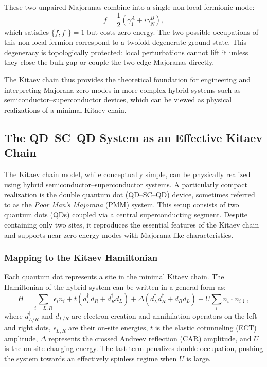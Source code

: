 \documentclass[11pt, letterpaper, titlepage]{article}
\begin{document}
These two unpaired Majoranas combine into a single non-local fermionic mode:
\begin{equation}
f = \frac{1}{2}(\gamma_1^A + i\gamma_N^B),
\end{equation}
which satisfies $\{f, f^\dagger\}=1$ but costs zero energy. The two possible occupations of this non-local fermion correspond to a twofold degenerate ground state. This degeneracy is topologically protected: local perturbations cannot lift it unless they close the bulk gap or couple the two edge Majoranas directly.

The Kitaev chain thus provides the theoretical foundation for engineering and interpreting Majorana zero modes in more complex hybrid systems such as semiconductor–superconductor devices, which can be viewed as physical realizations of a minimal Kitaev chain.
\subsection{The QD–SC–QD System as an Effective Kitaev Chain}

The Kitaev chain model, while conceptually simple, can be physically realized using hybrid semiconductor–superconductor systems. A particularly compact realization is the double quantum dot (QD–SC–QD) device, sometimes referred to as the \textit{Poor Man’s Majorana} (PMM) system. This setup consists of two quantum dots (QDs) coupled via a central superconducting segment. Despite containing only two sites, it reproduces the essential features of the Kitaev chain and supports near-zero-energy modes with Majorana-like characteristics.

\subsubsection{Mapping to the Kitaev Hamiltonian}

Each quantum dot represents a site in the minimal Kitaev chain. The Hamiltonian of the hybrid system can be written in a general form as:
\begin{equation}
H = \sum_{i=L,R} \epsilon_i n_i
+ t (d_L^\dagger d_R + d_R^\dagger d_L)
+ \Delta (d_L^\dagger d_R^\dagger + d_R d_L)
+ U \sum_i n_{i\uparrow} n_{i\downarrow},
\label{eq:qdsqdh}
\end{equation}
where $d_{L/R}^\dagger$ and $d_{L/R}$ are electron creation and annihilation operators on the left and right dots, $\epsilon_{L,R}$ are their on-site energies, $t$ is the elastic cotunneling (ECT) amplitude, $\Delta$ represents the crossed Andreev reflection (CAR) amplitude, and $U$ is the on-site charging energy. The last term penalizes double occupation, pushing the system towards an effectively spinless regime when $U$ is large.
\end{document}
